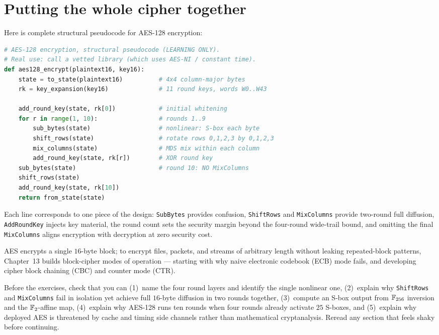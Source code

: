 \section{Putting the whole cipher together}

Here is complete structural pseudocode for AES-128 encryption:

\begin{lstlisting}[language=Python]
# AES-128 encryption, structural pseudocode (LEARNING ONLY).
# Real use: call a vetted library (which uses AES-NI / constant time).
def aes128_encrypt(plaintext16, key16):
    state = to_state(plaintext16)          # 4x4 column-major bytes
    rk = key_expansion(key16)              # 11 round keys, words W0..W43

    add_round_key(state, rk[0])            # initial whitening
    for r in range(1, 10):                 # rounds 1..9
        sub_bytes(state)                   # nonlinear: S-box each byte
        shift_rows(state)                  # rotate rows 0,1,2,3 by 0,1,2,3
        mix_columns(state)                 # MDS mix within each column
        add_round_key(state, rk[r])        # XOR round key
    sub_bytes(state)                       # round 10: NO MixColumns
    shift_rows(state)
    add_round_key(state, rk[10])
    return from_state(state)
\end{lstlisting}

Each line corresponds to one piece of the design: \texttt{SubBytes} provides
confusion, \texttt{ShiftRows} and \texttt{MixColumns} provide two-round full
diffusion, \texttt{AddRoundKey} injects key material, the round count sets the
security margin beyond the four-round wide-trail bound, and omitting the final
\texttt{MixColumns} aligns encryption with decryption at zero security cost.

AES encrypts a single $16$-byte block; to encrypt files, packets, and streams of
arbitrary length without leaking repeated-block patterns, Chapter~13 builds
block-cipher modes of operation --- starting with why naive electronic codebook
(ECB) mode fails, and developing cipher block chaining (CBC) and counter mode
(CTR).

\begin{recoverybox}
Before the exercises, check that you can (1)~name the four round layers and
identify the single nonlinear one, (2)~explain why \texttt{ShiftRows} and
\texttt{MixColumns} fail in isolation yet achieve full $16$-byte diffusion in two
rounds together, (3)~compute an S-box output from $\mathbb{F}_{256}$ inversion and the
$\mathbb{F}_2$-affine map, (4)~explain why AES-128 runs ten rounds when four rounds already
activate $25$ S-boxes, and (5)~explain why deployed AES is threatened by cache and
timing side channels rather than mathematical cryptanalysis. Reread any section
that feels shaky before continuing.
\end{recoverybox}

